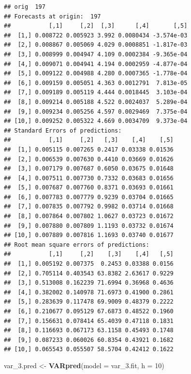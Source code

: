 \documentclass[12pt,a4paper]{article}
\newenvironment{Shaded}{\begin{snugshade}}{\end{snugshade}}
\newcommand{\DataTypeTok}[1]{\textcolor[rgb]{0.13,0.29,0.53}{#1}}
\newcommand{\DecValTok}[1]{\textcolor[rgb]{0.00,0.00,0.81}{#1}}
\newcommand{\FloatTok}[1]{\textcolor[rgb]{0.00,0.00,0.81}{#1}}
\newcommand{\KeywordTok}[1]{\textcolor[rgb]{0.13,0.29,0.53}{\textbf{#1}}}
\newcommand{\NormalTok}[1]{#1}
\newcommand{\StringTok}[1]{\textcolor[rgb]{0.31,0.60,0.02}{#1}}
\begin{document}
\begin{verbatim}
## orig  197 
## Forecasts at origin:  197 
##           [,1]     [,2]  [,3]      [,4]       [,5]
##  [1,] 0.008722 0.005923 3.992 0.0080434 -3.574e-03
##  [2,] 0.008867 0.005069 4.029 0.0008851 -1.817e-03
##  [3,] 0.008999 0.004947 4.109 0.0002384 -9.365e-04
##  [4,] 0.009071 0.004941 4.194 0.0002959 -4.877e-04
##  [5,] 0.009122 0.004988 4.280 0.0007365 -1.778e-04
##  [6,] 0.009159 0.005051 4.363 0.0012791  7.813e-05
##  [7,] 0.009189 0.005119 4.444 0.0018445  3.103e-04
##  [8,] 0.009214 0.005188 4.522 0.0024037  5.289e-04
##  [9,] 0.009234 0.005256 4.597 0.0029469  7.375e-04
## [10,] 0.009252 0.005322 4.669 0.0034709  9.373e-04
## Standard Errors of predictions:  
##           [,1]     [,2]   [,3]    [,4]    [,5]
##  [1,] 0.005115 0.007265 0.2417 0.03338 0.01536
##  [2,] 0.006539 0.007630 0.4410 0.03669 0.01626
##  [3,] 0.007179 0.007687 0.6050 0.03675 0.01648
##  [4,] 0.007511 0.007730 0.7332 0.03683 0.01656
##  [5,] 0.007687 0.007760 0.8371 0.03693 0.01661
##  [6,] 0.007783 0.007779 0.9239 0.03704 0.01665
##  [7,] 0.007835 0.007792 0.9982 0.03714 0.01668
##  [8,] 0.007864 0.007802 1.0627 0.03723 0.01672
##  [9,] 0.007880 0.007809 1.1193 0.03732 0.01674
## [10,] 0.007889 0.007816 1.1693 0.03740 0.01677
## Root mean square errors of predictions:  
##           [,1]     [,2]    [,3]    [,4]   [,5]
##  [1,] 0.005192 0.007375  0.2453 0.03388 0.0156
##  [2,] 0.705114 0.403543 63.8382 2.63617 0.9229
##  [3,] 0.513008 0.162239 71.6994 0.36968 0.4636
##  [4,] 0.382002 0.140978 71.6973 0.41900 0.2861
##  [5,] 0.283639 0.117478 69.9009 0.48379 0.2222
##  [6,] 0.210677 0.095129 67.6873 0.48522 0.1960
##  [7,] 0.156631 0.078414 65.4039 0.47118 0.1831
##  [8,] 0.116693 0.067173 63.1158 0.45493 0.1748
##  [9,] 0.087233 0.060026 60.8354 0.43921 0.1682
## [10,] 0.065543 0.055507 58.5704 0.42412 0.1622
\end{verbatim}

\begin{Shaded}
\begin{Highlighting}[]
\NormalTok{var_}\FloatTok{3.}\NormalTok{pred <-}\StringTok{ }\KeywordTok{VARpred}\NormalTok{(}\DataTypeTok{model =}\NormalTok{ var_}\FloatTok{3.}\NormalTok{fit, }\DataTypeTok{h =} \DecValTok{10}\NormalTok{)}
\end{Highlighting}
\end{Shaded}
\end{document}
